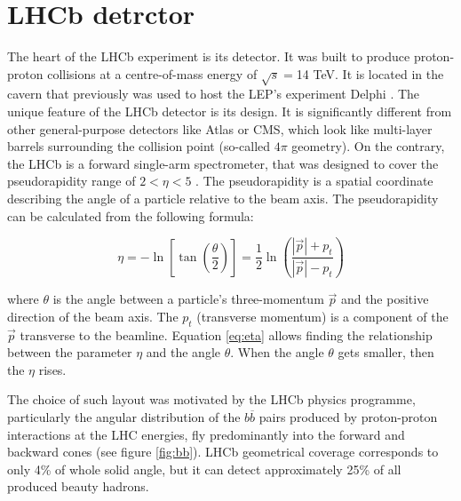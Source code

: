 \section{LHCb detrctor}

The heart of the LHCb experiment is its detector. It was built to produce proton-proton collisions at a centre-of-mass energy of $\sqrt{s}=$14 TeV. It is located in the cavern that previously was used to host the LEP's experiment Delphi \cite{deplhi}. The unique feature of the LHCb detector is its design. It is significantly different from other general-purpose detectors like Atlas or CMS, which look like multi-layer barrels surrounding the collision point (so-called $4 \pi$ geometry).
On the contrary, the LHCb is a forward single-arm spectrometer, that was designed to cover the pseudorapidity range of $2< \eta < 5 $  \cite{lhcb}. The pseudorapidity is a spatial coordinate describing the angle of a particle relative to the beam axis. The  pseudorapidity can be calculated from the following formula: 

\begin{equation}
    \eta = - \ln\left[ \tan \left( \frac{\theta }{2}\right) \right]\nonumber = \frac{1}{2} \ln \left( \frac{|\vec{p}|+ p_t}{|\vec{p}|- p_t}  \right)
    \label{eq:eta}
\end{equation}

where $\theta$  is the angle between a particle's three-momentum $\vec{p}$ and the positive direction of the beam axis. The $p_t$ (transverse momentum) is a component of the $\vec{p}$ transverse to the beamline.
Equation \ref{eq:eta} allows finding the relationship between the parameter $\eta$ and the angle $\theta$. When the angle $\theta$ gets smaller, then the $\eta$ rises.


The choice of such layout was motivated by the LHCb physics programme, particularly the angular distribution of the $b \overline{b}$ pairs produced by proton-proton interactions at the LHC energies, fly predominantly into the forward and backward cones (see figure \ref{fig:bb}). LHCb geometrical coverage corresponds to only 4\% of whole solid angle, but it can detect approximately 25\% of all produced beauty hadrons. 

